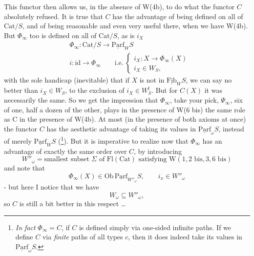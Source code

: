 \documentclass[11pt]{article}
\newcommand{\printedpage}[1]{\marginpar{\footnotesize p.~#1}}
\newcommand{\msp}[1]{\marginpar{\footnotesize [#1]}}
\newcommand{\und}[1]{\underline{\mathrm{#1}}}
\begin{document}
This functor then allows us, in the absence of W(4b), to do what the functor $C$ absolutely refused. It is true that $C$ has the advantage of being defined on all of $\mathrm{Cat}/S$, and of being
\printedpage{120}
reasonable and even very useful there, when we have W(4b). But $\Phi_\infty$ too is defined on all of $\mathrm{Cat}/S$, as is $i_X$
\[
\begin{aligned}
&\Phi_\infty : \mathrm{Cat}/S \longrightarrow \und{Parf}_W S\\
&i : \mathrm{id} \longrightarrow \Phi_\infty \qquad \text{i.e.}\ \begin{cases} i_X : X \longrightarrow \Phi_\infty(X)\\ i_X \in W_S, \end{cases}
\end{aligned}
\]
with the sole handicap (inevitable) that if $X$ is not in $\und{Fib}_W S$, we can say no better than $i_X \in W_S$, to the exclusion of $i_X \in W_S^{\mathrm{f}}$. But for $C(X)$ it was necessarily the same. So we get the impression that $\Phi_\infty$, take your pick, $\Psi_\infty$, six of one, half a dozen of the other, plays in the presence of W(6 bis) the same role as C in the presence of W(4b). At most (in the presence of both axioms at once) the functor $C$ has the aesthetic advantage of taking its values in $\und{Parf}_\omega S$, instead of merely $\und{Parf}_W S$ (\footnote[93]{\textit{In fact} $\Phi_\infty = C$, if $C$ is defined simply via one-sided infinite paths. If we define $C$ via \textit{finite} paths of all types $c$, then it does indeed take its values in $\und{Parf}_\omega S$.}). But it is imperative to %
\msp{page 195}
realize now that $\Phi_\infty$ has an advantage of exactly the same order over $C$, by introducing
\[
W''_\omega = \text{smallest subset } \Sigma \text{ of } \mathrm{Fl}(\mathrm{Cat}) \text{ satisfying } \mathrm{W}(1, 2\text{ bis}, 3, 6\text{ bis})
\]
and note that
\[
\Phi_\infty(X) \in \mathrm{Ob}\,\und{Parf}_{W''_\omega} S, \qquad i_x \in W''_\omega %
\]
- but here I notice that we have
\[
W_\omega \subseteq W''_\omega,
\]
so $C$ is still a bit better in this respect \ldots
\end{document}
